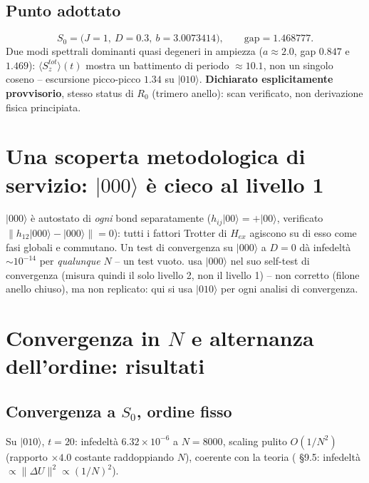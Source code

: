 \documentclass[11pt,a4paper]{article}
\newcommand{\ket}[1]{\lvert #1 \rangle}
\begin{document}
\subsection{Punto adottato}

\begin{equation*}
\boxed{S_0 = \big(J{=}1,\ D{=}0.3,\ b{=}3.0073414\big)}, \qquad \text{gap}=1.468777.
\end{equation*}
Due modi spettrali dominanti quasi degeneri in ampiezza ($a\approx2.0$, gap $0.847$ e $1.469$): $\langle S_z^{tot}\rangle(t)$ mostra un battimento di periodo $\approx10.1$, non un singolo coseno -- escursione picco-picco $1.34$ su $\ket{010}$. \textbf{Dichiarato esplicitamente provvisorio}, stesso status di $R_0$ (trimero anello): scan verificato, non derivazione fisica principiata.

\section{Una scoperta metodologica di servizio: $\ket{000}$ è cieco al livello 1}

$\ket{000}$ è autostato di \emph{ogni} bond separatamente ($h_{ij}\ket{00}=+\ket{00}$, verificato $\|h_{12}\ket{000}-\ket{000}\|=0$): tutti i fattori Trotter di $H_{ex}$ agiscono su di esso come fasi globali e commutano. Un test di convergenza su $\ket{000}$ a $D=0$ dà infedeltà $\sim10^{-14}$ per \emph{qualunque} $N$ -- un test vuoto. \texttt{} usa $\ket{000}$ nel suo self-test di convergenza (misura quindi il solo livello 2, non il livello 1) -- non corretto (filone anello chiuso), ma non replicato: qui si usa $\ket{010}$ per ogni analisi di convergenza.

\section{Convergenza in $N$ e alternanza dell'ordine: risultati}

\subsection{Convergenza a $S_0$, ordine fisso}

Su $\ket{010}$, $t=20$: infedeltà $6.32\times10^{-6}$ a $N=8000$, scaling pulito $O(1/N^2)$ (rapporto $\times4.0$ costante raddoppiando $N$), coerente con la teoria (\texttt{} \S9.5: infedeltà $\propto\|\Delta U\|^2\propto(1/N)^2$).
\end{document}
